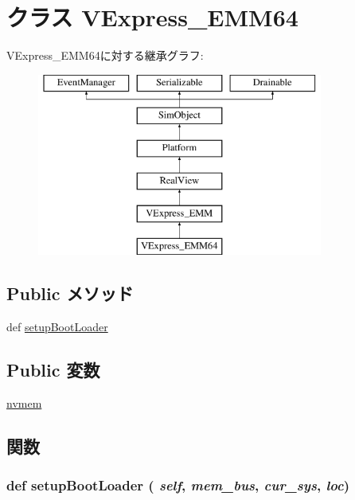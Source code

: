 \hypertarget{classRealView_1_1VExpress__EMM64}{
\section{クラス VExpress\_\-EMM64}
\label{classRealView_1_1VExpress__EMM64}
}
VExpress\_\-EMM64に対する継承グラフ:\begin{figure}[H]
\begin{center}
\leavevmode
\includegraphics[height=6cm]{classRealView_1_1VExpress__EMM64}
\end{center}
\end{figure}
\subsection*{Public メソッド}
\begin{DoxyCompactItemize}
\item 
def \hyperlink{classRealView_1_1VExpress__EMM64_a2bb8c2dabea2e4801ca416188787ef11}{setupBootLoader}
\end{DoxyCompactItemize}
\subsection*{Public 変数}
\begin{DoxyCompactItemize}
\item 
\hyperlink{classRealView_1_1VExpress__EMM64_abcf52781f9ca2926e1f879ceecb4865c}{nvmem}
\end{DoxyCompactItemize}


\subsection{関数}
\hypertarget{classRealView_1_1VExpress__EMM64_a2bb8c2dabea2e4801ca416188787ef11}{
\subsubsection[{setupBootLoader}]{\setlength{\rightskip}{0pt plus 5cm}def setupBootLoader ( {\em self}, \/   {\em mem\_\-bus}, \/   {\em cur\_\-sys}, \/   {\em loc})}}
\label{classRealView_1_1VExpress__EMM64_a2bb8c2dabea2e4801ca416188787ef11}


